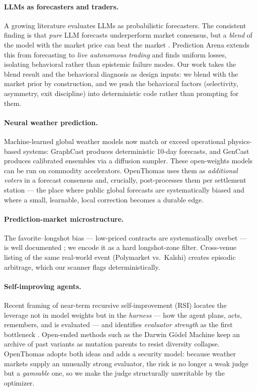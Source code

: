 \documentclass[10pt,twocolumn]{article}
\begin{document}
\paragraph{LLMs as forecasters and traders.} A growing literature evaluates LLMs
as probabilistic forecasters. The consistent finding is that \emph{pure} LLM
forecasts underperform market consensus, but a \emph{blend} of the model with the
market price can beat the market \cite{blend}. Prediction Arena \cite{predarena}
extends this from forecasting to \emph{live autonomous trading} and finds
uniform losses, isolating behavioral rather than epistemic failure modes. Our
work takes the blend result and the behavioral diagnosis as design inputs: we
blend with the market prior by construction, and we push the behavioral factors
(selectivity, asymmetry, exit discipline) into deterministic code rather than
prompting for them.

\paragraph{Neural weather prediction.} Machine-learned global weather models now
match or exceed operational physics-based systems: GraphCast \cite{graphcast}
produces deterministic 10-day forecasts, and GenCast \cite{gencast} produces
calibrated ensembles via a diffusion sampler. These open-weights models can be
run on commodity accelerators. OpenThomas uses them as \emph{additional voters}
in a forecast consensus and, crucially, post-processes them per settlement
station --- the place where public global forecasts are systematically biased and
where a small, learnable, local correction becomes a durable edge.

\paragraph{Prediction-market microstructure.} The favorite--longshot bias ---
low-priced contracts are systematically overbet --- is well documented
\cite{longshot}; we encode it as a hard longshot-zone filter. Cross-venue
listing of the same real-world event (Polymarket vs.\ Kalshi) creates episodic
arbitrage, which our scanner flags deterministically.

\paragraph{Self-improving agents.} Recent framing of near-term recursive
self-improvement (RSI) locates the leverage not in model weights but in the
\emph{harness} --- how the agent plans, acts, remembers, and is evaluated --- and
identifies \emph{evaluator strength} as the first bottleneck \cite{harness}.
Open-ended methods such as the Darwin Gödel Machine \cite{dgm} keep an archive of
past variants as mutation parents to resist diversity collapse. OpenThomas adopts
both ideas and adds a security model: because weather markets supply an unusually
strong evaluator, the risk is no longer a weak judge but a \emph{gameable} one,
so we make the judge structurally unwritable by the optimizer.
\end{document}
